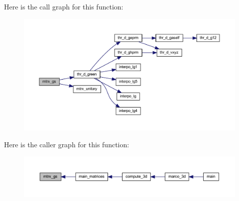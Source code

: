 Here is the call graph for this function\+:
\nopagebreak
\begin{figure}[H]
\begin{center}
\leavevmode
\includegraphics[width=350pt]{Marco_8f90_ab80bc274f8a08000a99dd5a512ad0729_cgraph}
\end{center}
\end{figure}
Here is the caller graph for this function\+:
\nopagebreak
\begin{figure}[H]
\begin{center}
\leavevmode
\includegraphics[width=350pt]{Marco_8f90_ab80bc274f8a08000a99dd5a512ad0729_icgraph}
\end{center}
\end{figure}
\mbox{\label{Marco_8f90_a1a5af411215f6aafd8701c9d0a5841ab}} 
